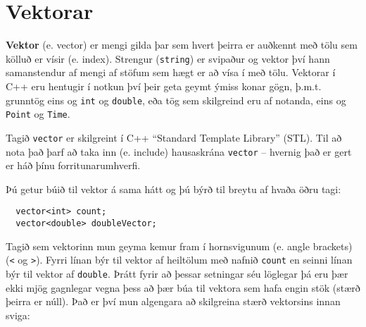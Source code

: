 





\chapter{Vektorar}
\label{vectors}

{\bf Vektor} (e. vector) er mengi gilda þar sem hvert þeirra er auðkennt með tölu sem kölluð er vísir (e. index).
Strengur ({\tt string}) er svipaður og vektor því hann samanstendur af mengi af stöfum sem hægt er að vísa í með tölu.
Vektorar í C++ eru hentugir í notkun því þeir geta geymt ýmiss konar gögn, þ.m.t. grunntög eins og {\tt int} og {\tt double}, 
eða tög sem skilgreind eru af notanda, eins og {\tt Point} og {\tt Time}.

Tagið {\tt vector} er skilgreint í C++ ``Standard Template Library'' (STL).
Til að nota það þarf að taka inn (e. include) hausaskrána {\tt vector} -- hvernig það er gert er háð þínu forritunarumhverfi.

Þú getur búið til vektor á sama hátt og þú býrð til breytu af hvaða öðru tagi:

\begin{verbatim}
  vector<int> count;
  vector<double> doubleVector;
\end{verbatim}
%
Tagið sem vektorinn mun geyma kemur fram í hornsvigunum (e. angle brackets) ({\tt <} og {\tt >}).
Fyrri línan býr til vektor af heiltölum með nafnið {\tt count} en seinni línan býr til vektor af {\tt double}.
Þrátt fyrir að þessar setningar séu löglegar þá eru þær ekki mjög gagnlegar vegna þess að þær búa til vektora sem hafa engin stök (stærð þeirra er núll).
Það er því mun algengara að skilgreina stærð vektorsins innan sviga: 


